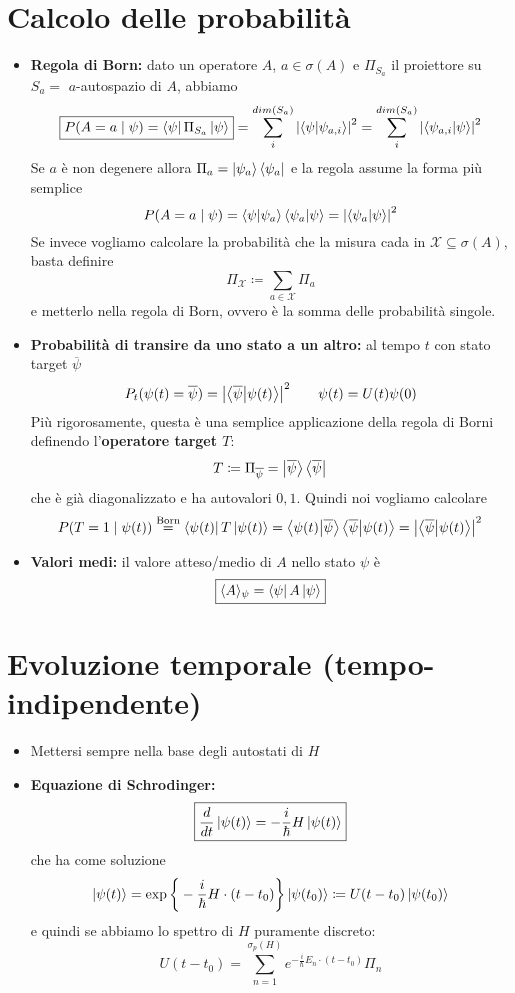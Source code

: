 \documentclass[a4paper,10pt]{article}
\theoremstyle{definition}
\theoremstyle{indentdefinition}
\theoremstyle{indenttheorem}
\theoremstyle{myremark}
\theoremstyle{indentgeneral}
\begin{document}
\section{Calcolo delle probabilità}
\begin{itemize}
\item \textbf{Regola di Born:} dato un operatore $A$, $a\in\sigma(A)$ e $\Pi_{S_a}$ il proiettore su $S_a=$ $a$-autospazio di $A$, abbiamo
$$\boxed{P(A=a\mid \psi)=\bra{\psi}\Pi_{S_a}\ket{\psi}}=\sum_{i}^{dim(S_a)}\abs{\bra{\psi}\ket{\psi_{a,i}}}^2=\sum_{i}^{dim(S_a)}\abs{\bra{\psi_{a,i}}\ket{\psi}}^2$$
Se $a$ è non degenere allora $\Pi_a=\ket{\psi_a}\bra{\psi_a}$ e la regola assume la forma più semplice
$$P(A=a\mid \psi)=\bra{\psi}\ket{\psi_a}\bra{\psi_a}\ket{\psi}=\abs{\bra{\psi_a}\ket{\psi}}^2$$
Se invece vogliamo calcolare la probabilità che la misura cada in $\mathcal{X}\subseteq \sigma(A)$, basta definire
$$\Pi_\mathcal{X}\coloneqq\sum_{a\in \mathcal{X}}\Pi_a$$
e metterlo nella regola di Born, ovvero è la somma delle probabilità singole.
    \item \textbf{Probabilità di transire da uno stato a un altro:} al tempo $t$ con stato target $\overline{\psi}$
    $$P_t(\psi(t)=\overline{\psi})=\abs{\bra{\overline{\psi}}\ket{\psi(t)}}^2\qquad \psi(t)=U(t)\psi(0)$$
    Più rigorosamente, questa è una semplice applicazione della regola di Borni definendo l'\textbf{operatore target $T$}:
    $$T\coloneqq \Pi_{\overline{\psi}}=\ket{\overline{\psi}}\bra{\overline{\psi}}$$
    che è già diagonalizzato e ha autovalori $0,1$. Quindi noi vogliamo calcolare
    $$P(T=1\mid \psi(t))\overset{\text{Born}}{=}\bra{\psi(t)}T\ket{\psi(t)}=\bra{\psi(t)}\ket{\overline{\psi}}\bra{\overline{\psi}}\ket{\psi(t)}=\abs{\bra{\overline{\psi}}\ket{\psi(t)}}^2$$
    \item \textbf{Valori medi:} il valore atteso/medio di $A$ nello stato $\psi$ è
    $$\boxed{\langle A\rangle_\psi=\bra{\psi}A\ket{\psi}}$$
\end{itemize}
\section{Evoluzione temporale (tempo-indipendente)}
\begin{itemize}
    \item Mettersi sempre nella base degli autostati di $H$
    \item \textbf{Equazione di Schrodinger:}
    $$\boxed{\frac{d}{dt}\ket{\psi(t)}=-\frac{i}{\hbar}H\ket{\psi(t)}}$$
    che ha come soluzione
    $$\ket{\psi(t)}=\exp\bigg\{-\frac{i}{\hbar}H \cdot (t-t_0)\bigg\}\ket{\psi(t_0)}\coloneqq U(t-t_0)\ket{\psi(t_0)}$$
    e quindi se abbiamo lo spettro di $H$ puramente discreto:
    $$U(t-t_0)=\sum_{n=1}^{\sigma_p(H)}e^{-\frac{i}{\hbar}E_n\cdot(t-t_0)}\Pi_n$$
\end{itemize}
\end{document}
